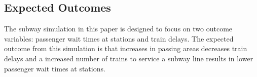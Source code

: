 \subsection{Expected Outcomes}

The subway simulation in this paper is designed to focus on two outcome variables: passenger wait times at stations and train delays. The expected outcome from this simulation is that increases in passing areas decreases train delays and a increased number of trains to service a subway line results in lower passenger wait times at stations.